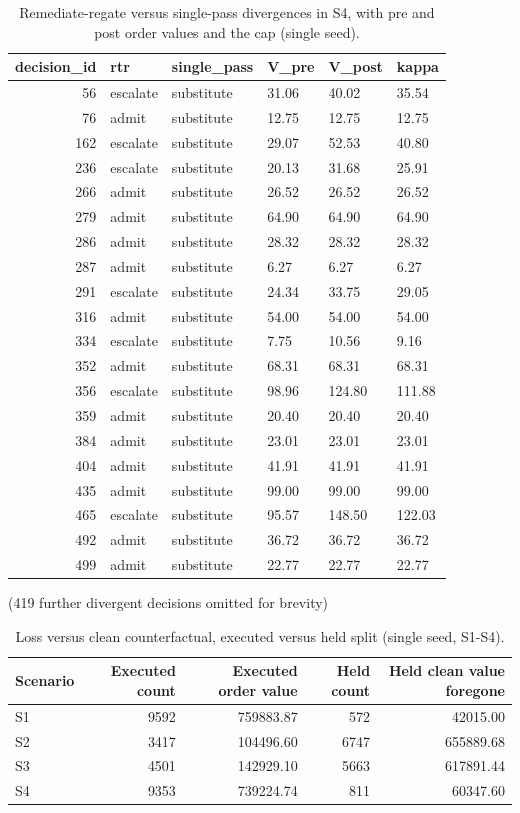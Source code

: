 \documentclass[11pt,a4paper]{article}
\theoremstyle{definition}
\begin{document}
\begin{table}[H]
\centering
\caption{Remediate-regate versus single-pass divergences in S4, with pre and post order values and the cap (single seed).}
\small
\begin{tabular}{rlllll}
\toprule
decision\_id & rtr & single\_pass & V\_pre & V\_post & kappa \\
\midrule
56 & escalate & substitute & 31.06 & 40.02 & 35.54 \\
76 & admit & substitute & 12.75 & 12.75 & 12.75 \\
162 & escalate & substitute & 29.07 & 52.53 & 40.80 \\
236 & escalate & substitute & 20.13 & 31.68 & 25.91 \\
266 & admit & substitute & 26.52 & 26.52 & 26.52 \\
279 & admit & substitute & 64.90 & 64.90 & 64.90 \\
286 & admit & substitute & 28.32 & 28.32 & 28.32 \\
287 & admit & substitute & 6.27 & 6.27 & 6.27 \\
291 & escalate & substitute & 24.34 & 33.75 & 29.05 \\
316 & admit & substitute & 54.00 & 54.00 & 54.00 \\
334 & escalate & substitute & 7.75 & 10.56 & 9.16 \\
352 & admit & substitute & 68.31 & 68.31 & 68.31 \\
356 & escalate & substitute & 98.96 & 124.80 & 111.88 \\
359 & admit & substitute & 20.40 & 20.40 & 20.40 \\
384 & admit & substitute & 23.01 & 23.01 & 23.01 \\
404 & admit & substitute & 41.91 & 41.91 & 41.91 \\
435 & admit & substitute & 99.00 & 99.00 & 99.00 \\
465 & escalate & substitute & 95.57 & 148.50 & 122.03 \\
492 & admit & substitute & 36.72 & 36.72 & 36.72 \\
499 & admit & substitute & 22.77 & 22.77 & 22.77 \\
\bottomrule
\end{tabular}

\medskip
\noindent(419 further divergent decisions omitted for brevity)
\end{table}

\begin{table}[H]
\centering
\caption{Loss versus clean counterfactual, executed versus held split (single seed, S1-S4).}
\begin{tabular}{lrrrr}
\toprule
Scenario & Executed count & Executed order value & Held count & Held clean value foregone \\
\midrule
S1 & 9592 & 759883.87 & 572 & 42015.00 \\
S2 & 3417 & 104496.60 & 6747 & 655889.68 \\
S3 & 4501 & 142929.10 & 5663 & 617891.44 \\
S4 & 9353 & 739224.74 & 811 & 60347.60 \\
\bottomrule
\end{tabular}
\end{table}
\end{document}

